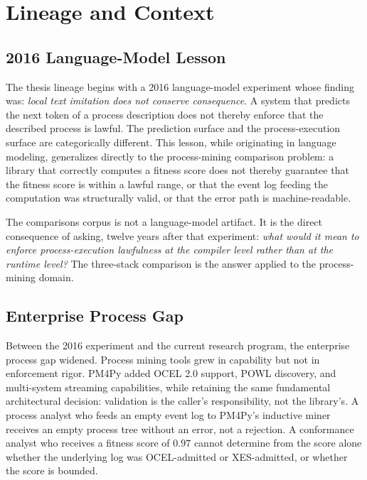 
\section{Lineage and Context}
\label{sec:comparisons-lineage}

\subsection{2016 Language-Model Lesson}
\label{sec:comparisons-lineage-lm}

The thesis lineage begins with a 2016 language-model experiment whose finding was:
\emph{local text imitation does not conserve consequence}. A system that predicts
the next token of a process description does not thereby enforce that the described
process is lawful. The prediction surface and the process-execution surface are
categorically different. This lesson, while originating in language modeling,
generalizes directly to the process-mining comparison problem: a library that
correctly computes a fitness score does not thereby guarantee that the fitness
score is within a lawful range, or that the event log feeding the computation was
structurally valid, or that the error path is machine-readable.

The comparisons corpus is not a language-model artifact. It is the direct
consequence of asking, twelve years after that experiment: \emph{what would it
mean to enforce process-execution lawfulness at the compiler level rather than at
the runtime level?} The three-stack comparison is the answer applied to the
process-mining domain.

\subsection{Enterprise Process Gap}
\label{sec:comparisons-lineage-enterprise}

Between the 2016 experiment and the current research program, the enterprise
process gap widened. Process mining tools grew in capability but not in
enforcement rigor. PM4Py added OCEL 2.0 support, POWL discovery, and multi-system
streaming capabilities, while retaining the same fundamental architectural
decision: validation is the caller's responsibility, not the library's. A process
analyst who feeds an empty event log to PM4Py's inductive miner receives an empty
process tree without an error, not a rejection. A conformance analyst who receives
a fitness score of $0.97$ cannot determine from the score alone whether the
underlying log was OCEL-admitted or XES-admitted, or whether the score is bounded.

